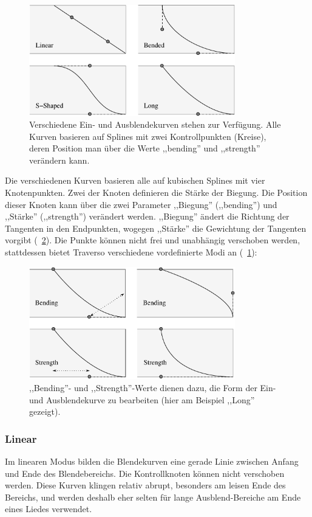 \begin{figure}[t]
 \centering\includegraphics[width=0.8\textwidth]{../images/fades}
 \caption{Verschiedene Ein- und Ausblendekurven stehen zur Verfügung. Alle Kurven basieren auf Splines mit zwei Kontrollpunkten (Kreise), deren Position man über die Werte ,,bending'' und ,,strength'' verändern kann.}
 \label{fig_fades01}
\end{figure}

Die verschiedenen Kurven basieren alle auf kubischen Splines mit vier Knotenpunkten. Zwei der Knoten definieren die Stärke der Biegung. Die Position dieser Knoten kann über die zwei Parameter ,,Biegung'' (,,bending'') und ,,Stärke'' (,,strength'') verändert werden. ,,Biegung'' ändert die Richtung der Tangenten in den Endpunkten, wogegen ,,Stärke'' die Gewichtung der Tangenten vorgibt (\FigB~\ref{fig_fades02}). Die Punkte können nicht frei und unabhängig verschoben werden, stattdessen bietet Traverso verschiedene vordefinierte Modi an (\FigB~\ref{fig_fades01}):

\begin{figure}[t]
 \centering\includegraphics[width=0.8\textwidth]{../images/fades2}
 \caption{,,Bending''- und ,,Strength''-Werte dienen dazu, die Form der Ein- und Ausblendekurve zu bearbeiten (hier am Beispiel ,,Long'' gezeigt).}
 \label{fig_fades02}
\end{figure}

\subsubsection{Linear}
Im linearen Modus bilden die Blendekurven eine gerade Linie zwischen Anfang und Ende des Blendebereichs. Die Kontrollknoten können nicht verschoben werden. Diese Kurven klingen relativ abrupt, besonders am leisen Ende des Bereichs, und werden deshalb eher selten für lange Ausblend-Bereiche am Ende eines Liedes verwendet.

